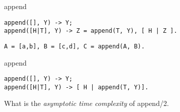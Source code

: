 \begin{frame}[fragile]{append}

\begin{verbatim}
append([], Y) -> Y;
append([H|T], Y) -> Z = append(T, Y), [ H | Z ].
\end{verbatim}

\pause
\begin{verbatim}
A = [a,b], B = [c,d], C = append(A, B).
\end{verbatim}

\pause


\end{frame}



\begin{frame}[fragile]{append}

\begin{verbatim}
append([], Y) -> Y;
append([H|T], Y) -> [ H | append(T, Y)].
\end{verbatim}

\pause\vspace{20pt} What is the {\em asymptotic time complexity} of append/2.
\end{frame}


